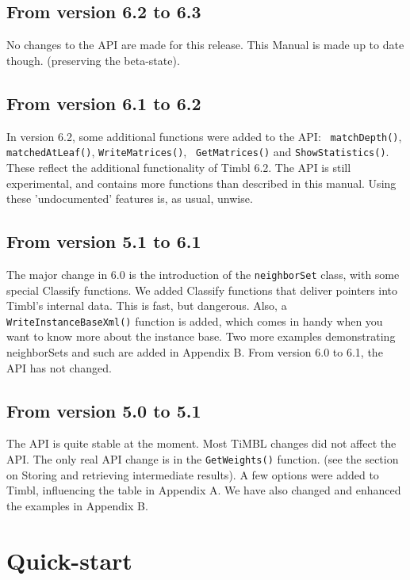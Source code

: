 \documentclass{report}
\begin{document}
\section{From version 6.2 to 6.3}

No changes to the API are made for this release. This Manual is made up to date though. (preserving the beta-state).
 
\section{From version 6.1 to 6.2}

In version 6.2, some additional functions were added to the API: {\tt
  matchDepth()}, {\tt matchedAtLeaf()}, {\tt WriteMatrices()}, {\tt
  GetMatrices()} and {\tt ShowStatistics()}. These reflect the
additional functionality of Timbl 6.2.  The API is still experimental,
and contains more functions than described in this manual. Using these
'undocumented' features is, as usual, unwise.

\section{From version 5.1 to 6.1}

The major change in 6.0 is the introduction of the {\tt neighborSet}
class, with some special Classify functions.  We added Classify
functions that deliver pointers into Timbl's internal data. This is
fast, but dangerous.  Also, a {\tt WriteInstanceBaseXml()} function is
added, which comes in handy when you want to know more about the
instance base.  Two more examples demonstrating neighborSets and such
are added in Appendix B. From version 6.0 to 6.1, the API has not changed.

\section{From version 5.0 to 5.1}

The API is quite stable at the moment. Most TiMBL changes did not
affect the API. The only real API change is in the {\tt GetWeights()}
function. (see the section on Storing and retrieving intermediate
results).  A few options were added to Timbl, influencing the table in
Appendix A. We have also changed and enhanced the examples in Appendix
B.

\chapter{Quick-start}
\end{document}

